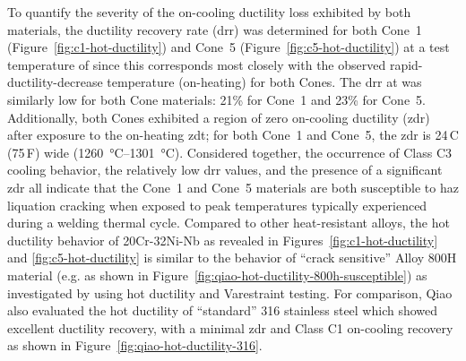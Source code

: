 {To quantify the severity of the on-cooling ductility loss exhibited by both materials, the ductility recovery rate (\gls{drr}) was determined for both Cone~1 (Figure~\ref{fig:c1-hot-ductility}) and Cone~5 (Figure~\ref{fig:c5-hot-ductility}) at a test temperature of  since this corresponds most closely with the observed rapid-ductility-decrease temperature (on-heating) for both Cones.  The \gls{drr} at  was similarly low for both Cone materials: 21\% for Cone~1 and 23\% for Cone~5.  Additionally, both Cones exhibited a region of zero on-cooling ductility (\gls{zdr}) after exposure to the on-heating \gls{zdt}; for both Cone~1 and Cone~5, the \gls{zdr} is 24\,C\textdegree{} (75\,F\textdegree{}) wide (\SIrange[range-phrase=--]{1260}{1301}{\degreeCelsius}).  Considered together, the occurrence of Class C3 cooling behavior, the relatively low \gls{drr} values, and the presence of a significant \gls{zdr} all indicate that the Cone~1 and Cone~5 materials are both susceptible to \gls{haz} liquation cracking when exposed to peak temperatures typically experienced during a welding thermal cycle. Compared to other heat-resistant alloys, the hot ductility behavior of 20Cr-32Ni-Nb as revealed in Figures~\ref{fig:c1-hot-ductility} and \ref{fig:c5-hot-ductility} is similar to the behavior of ``crack sensitive'' Alloy 800H material (e.g. as shown in Figure~\ref{fig:qiao-hot-ductility-800h-susceptible}) as investigated by \citet{qiao_weldability_1993} using hot ductility and Varestraint testing. For comparison, Qiao also evaluated the hot ductility of ``standard'' 316 stainless steel which showed excellent ductility recovery, with a minimal \gls{zdr} and Class C1 on-cooling recovery as shown in Figure~\ref{fig:qiao-hot-ductility-316}.

}
